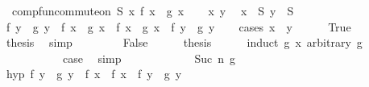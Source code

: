 \begin{isabellebody}
\ \ {\isachardoublequoteopen}comp{\isacharunderscore}{\kern0pt}fun{\isacharunderscore}{\kern0pt}commute{\isacharunderscore}{\kern0pt}on\ S\ {\isacharparenleft}{\kern0pt}{\isasymlambda}x{\isachardot}{\kern0pt}\ f\ x\ {\isacharcircum}{\kern0pt}{\isacharcircum}{\kern0pt}\ g\ x{\isacharparenright}{\kern0pt}{\isachardoublequoteclose}\isanewline
%
\isadelimproof
%
\endisadelimproof
%
\isatagproof
{}\isamarkupfalse%
\isanewline
\ \ \isamarkupfalse%
\ x\ y\ \isamarkupfalse%
\ {\isachardoublequoteopen}x\ {\isasymin}\ S{\isachardoublequoteclose}\ {\isachardoublequoteopen}y\ {\isasymin}\ S{\isachardoublequoteclose}\isanewline
\ \ \isamarkupfalse%
\ {\isachardoublequoteopen}f\ y\ {\isacharcircum}{\kern0pt}{\isacharcircum}{\kern0pt}\ g\ y\ {\isasymcirc}\ f\ x\ {\isacharcircum}{\kern0pt}{\isacharcircum}{\kern0pt}\ g\ x\ {\isacharequal}{\kern0pt}\ f\ x\ {\isacharcircum}{\kern0pt}{\isacharcircum}{\kern0pt}\ g\ x\ {\isasymcirc}\ f\ y\ {\isacharcircum}{\kern0pt}{\isacharcircum}{\kern0pt}\ g\ y{\isachardoublequoteclose}\isanewline
\ \ \isamarkupfalse%
\ {\isacharparenleft}{\kern0pt}cases\ {\isachardoublequoteopen}x\ {\isacharequal}{\kern0pt}\ y{\isachardoublequoteclose}{\isacharparenright}{\kern0pt}\isanewline
\ \ \ \ \isamarkupfalse%
\ True\isanewline
\ \ \ \ \isamarkupfalse%
\ \isamarkupfalse%
\ {\isacharquery}{\kern0pt}thesis\ \isamarkupfalse%
\ simp\isanewline
\ \ \isamarkupfalse%
\isanewline
\ \ \ \ \isamarkupfalse%
\ False\isanewline
\ \ \ \ \isamarkupfalse%
\ {\isacharquery}{\kern0pt}thesis\isanewline
\ \ \ \ \isamarkupfalse%
\ {\isacharparenleft}{\kern0pt}induct\ {\isachardoublequoteopen}g\ x{\isachardoublequoteclose}\ arbitrary{\isacharcolon}{\kern0pt}\ g{\isacharparenright}{\kern0pt}\isanewline
\ \ \ \ \ \ \isamarkupfalse%
\ {}\isanewline
\ \ \ \ \ \ \isamarkupfalse%
\ \isamarkupfalse%
\ {\isacharquery}{\kern0pt}case\ \isamarkupfalse%
\ simp\isanewline
\ \ \ \ \isamarkupfalse%
\isanewline
\ \ \ \ \ \ \isamarkupfalse%
\ {\isacharparenleft}{\kern0pt}Suc\ n\ g{\isacharparenright}{\kern0pt}\isanewline
\ \ \ \ \ \ \isamarkupfalse%
\ hyp{}{\isacharcolon}{\kern0pt}\ {\isachardoublequoteopen}f\ y\ {\isacharcircum}{\kern0pt}{\isacharcircum}{\kern0pt}\ g\ y\ {\isasymcirc}\ f\ x\ {\isacharequal}{\kern0pt}\ f\ x\ {\isasymcirc}\ f\ y\ {\isacharcircum}{\kern0pt}{\isacharcircum}{\kern0pt}\ g\ y{\isachardoublequoteclose}\isanewline

\end{isabellebody}
